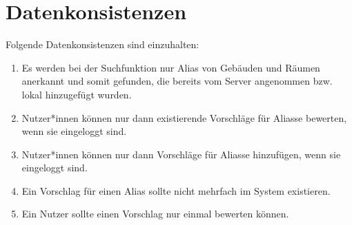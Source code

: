 \section{Datenkonsistenzen}

Folgende Datenkonsistenzen sind einzuhalten:
\begin{enumerate}[label=\textbf{/T\arabic*0/}, align=left, resume]
	\item Es werden bei der Suchfunktion nur Alias von Gebäuden und Räumen anerkannt und somit gefunden, die bereits vom Server angenommen bzw. lokal hinzugefügt wurden.
	\item Nutzer*innen können nur dann existierende Vorschläge für Aliasse bewerten, wenn sie eingeloggt sind.
	\item Nutzer*innen können nur dann Vorschläge für Aliasse hinzufügen, wenn sie eingeloggt sind.
	\item Ein Vorschlag für einen Alias sollte nicht mehrfach im System existieren.
	\item Ein Nutzer sollte einen Vorschlag nur einmal bewerten können.
\end{enumerate}